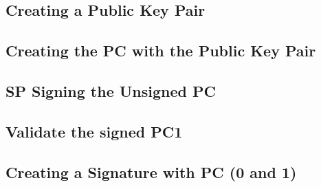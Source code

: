 \subsection{Creating a Public Key Pair}

\subsection{Creating the \ac{PC} with the Public Key Pair}

\subsection{\ac{SP} Signing the Unsigned \ac{PC}}

\subsection{Validate the signed \ac{PC1}}

\subsection{Creating a Signature with \ac{PC} (0 and 1)}